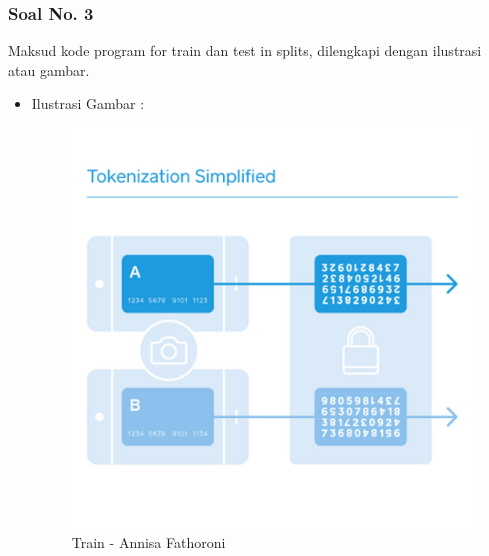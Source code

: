 \subsubsection{Soal No. 3}
Maksud kode program for train dan test in splits, dilengkapi dengan ilustrasi atau gambar.
\begin{itemize}
    \item Ilustrasi Gambar :
\hfill \break
    \begin{figure}[!hbtp]
    \centering
    \includegraphics[scale=0.4]{figures/Chapter 7/1164067/Teori/Chapter7AnnisaFathoroni1.jpg}
    \caption{Train - Annisa Fathoroni}
    \label{Train - Annisa Fathoroni}
    \end{figure}


\end{itemize}
